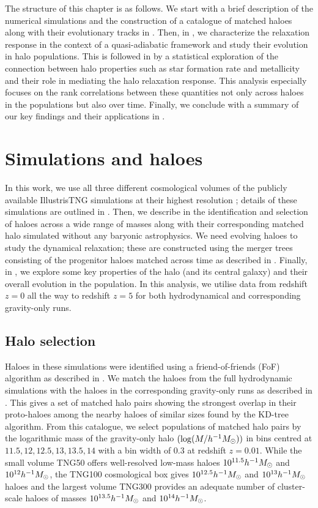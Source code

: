 The structure of this chapter is as follows. We start with a brief description of the numerical simulations and the construction of a catalogue of matched haloes along with their evolutionary tracks in . Then, in , we characterize the relaxation response in the context of a quasi-adiabatic framework and study their evolution in halo populations. This is followed in  by a statistical exploration of the connection between halo properties such as star formation rate and metallicity and their role in mediating the halo relaxation response. This analysis especially focuses on the rank correlations between these quantities not only across haloes in the populations but also over time. %
Finally, we conclude with a summary of our key findings and their applications in .


\section{Simulations and haloes}
\label{sec:simhals}
In this work, we use all three different cosmological volumes of the publicly available IllustrisTNG simulations at their highest resolution \citep{2019ComAC...6....2N}; details of these simulations are outlined in . Then, we describe in  the identification and selection of haloes across a wide range of masses along with their corresponding matched halo simulated without any baryonic astrophysics. We need evolving haloes to study the dynamical relaxation; these are constructed using the merger trees consisting of the progenitor haloes matched across time as described in . Finally, in , we explore some key properties of the halo (and its central galaxy) and their overall evolution in the population. In this analysis, we utilise data from redshift $z=0$ all the way to redshift $z=5$ for both hydrodynamical and corresponding gravity-only runs.

\subsection{Halo selection}
\label{sec:methods-halopairsel}
Haloes in these simulations were identified using a friend-of-friends (FoF) algorithm as described in . We match the haloes from the full hydrodynamic simulations with the haloes in the corresponding gravity-only runs as described in . This gives a set of matched halo pairs showing the strongest overlap in their proto-haloes among the nearby haloes of similar sizes found by the KD-tree algorithm. From this catalogue, we select populations of matched halo pairs by the logarithmic mass of the gravity-only halo $(\log(M/h^{-1}M_{\odot}))$ in bins centred at $11.5, 12, 12.5, 13, 13.5, 14$ with a bin width of 0.3 at redshift $z=0.01$. While the small volume TNG50 offers well-resolved low-mass haloes $10^{11.5} h^{-1}M_{\odot}$ and $10^{12} h^{-1}M_{\odot}$, the TNG100 cosmological box gives $10^{12.5} h^{-1}M_{\odot}$ and $10^{13} h^{-1}M_{\odot}$ haloes and the largest volume TNG300 provides an adequate number of cluster-scale haloes of masses $10^{13.5} h^{-1}M_{\odot}$ and $10^{14} h^{-1}M_{\odot}$. 
   

